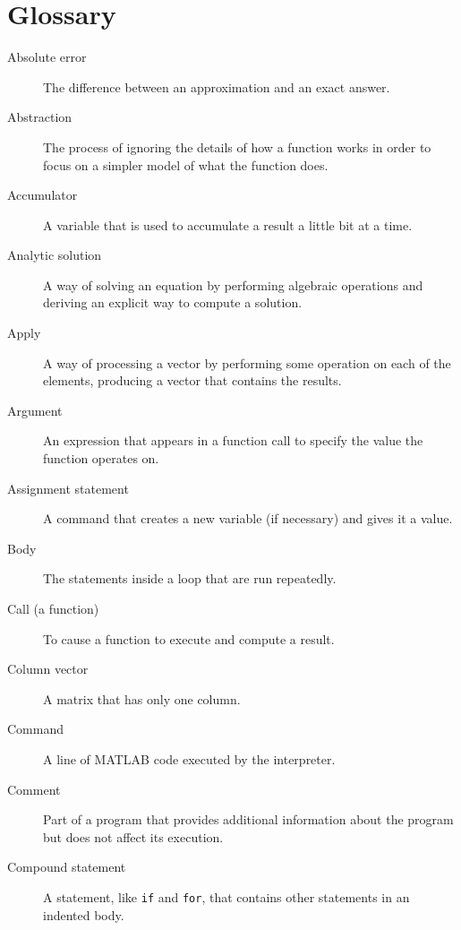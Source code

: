 

\chapter{Glossary}

\begin{description}


\item[Absolute error] The difference between an approximation and
an exact answer.

\item[Abstraction] The process of ignoring the details of how
a function works in order to focus on a simpler model of what the
function does.

\item[Accumulator] A variable that is used to accumulate a result
a little bit at a time.

\item[Analytic solution] A way of solving an equation by performing
algebraic operations and deriving an explicit way to
compute a solution.

\item[Apply] A way of processing a vector by performing some operation
on each of the elements, producing a vector that contains the
results.

\item[Argument] An expression that appears in a function call to
specify the value the function operates on.

\item[Assignment statement] A command that creates a new variable
(if necessary) and gives it a value.

\item[Body] The statements inside a loop that are run
repeatedly.

\item[Call (a function)] To cause a function to execute and compute a result.

\item[Column vector] A matrix that has only one column.

\item[Command] A line of MATLAB code executed by the interpreter.

\item[Comment] Part of a program that provides additional information
about the program but does not affect its execution.

\item[Compound statement] A statement, like \lstinline{if} and \lstinline{for}, that
contains other statements in an indented body.


\end{description}
